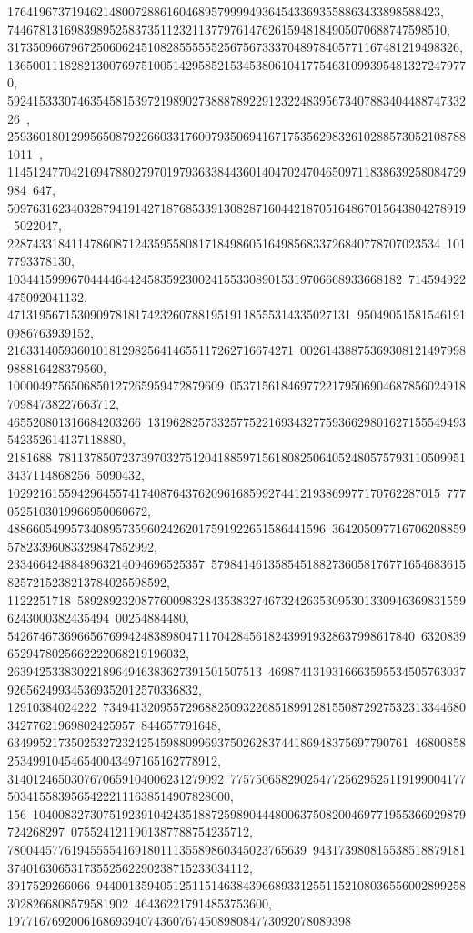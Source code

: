 {{{   17641967371946214800728861604689579999493645433693558863433898588423, 
   744678131698398952583735112321137797614762615948184905070688747598510, 
   31735096679672506062451082855555525675673337048978405771167481219498326, 
   1365001118282130076975100514295852153453806104177546310993954813272479770, 
   59241533307463545815397219890273888789229123224839567340788340448874733226\
, 
   2593601801299565087922660331760079350694167175356298326102885730521087881011\
, 114512477042169478802797019793633844360140470247046509711838639258084729984\
647, 509763162340328794191427187685339130828716044218705164867015643804278919\
5022047, 22874331841147860871243595580817184986051649856833726840778707023534\
1017793378130, 10344159996704444644245835923002415533089015319706668933668182\
714594922475092041132, 471319567153090978181742326078819519118555314335027131\
950490515815461910986763939152, 216331405936010181298256414655117262716674271\
00261438875369308121497998988816428379560, 1000049756506850127265959472879609\
053715618469772217950690468785602491870984738227663712, 465520801316684203266\
13196282573325775221693432775936629801627155549493542352614137118880, 2181688\
78113785072373970327512041885971561808250640524805757931105099513437114868256\
5090432, 10292161559429645574174087643762096168599274412193869977170762287015\
7770525103019966950060672, 48866054995734089573596024262017591922651586441596\
36420509771670620885957823396083329847852992, 2334664248848963214094696525357\
57984146135854518827360581767716546836158257215238213784025598592, 1122251718\
58928923208776009832843538327467324263530953013309463698315596243000382435494\
00254884480, 5426746736966567699424838980471170428456182439919328637998617840\
63208396529478025662222068219196032, 2639425338302218964946383627391501507513\
4698741319316663595534505763037926562499345369352012570336832, 12910384024222\
73494132095572968825093226851899128155087292753231334468034277621969802425957\
844657791648, 634995217350253272324254598809969375026283744186948375697790761\
46800858253499104546540043497165162778912, 3140124650307670659104006231279092\
775750658290254772562952511919900417750341558395654222111638514907828000, 156\
10400832730751923910424351887259890444800637508200469771955366929879724268297\
0755241211901387788754235712, 78004457761945555416918011135589860345023765639\
94317398081553851887918137401630653173552562290238715233034112, 3917529266066\
94400135940512511514638439668933125511521080365560028992583028266808579581902\
464362217914853753600, 197716769200616869394074360767450898084773092078089398\
}}}
